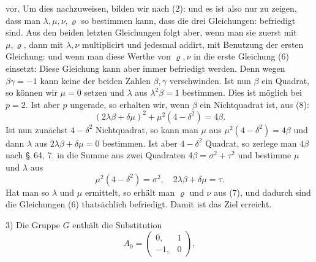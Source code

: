 vor. Um dies nachzuweisen, bilden wir nach (2):
und es ist also nur zu zeigen, dass man $\lambda,\mu,\nu,\varrho$ so bestimmen kann, dass die drei Gleichungen:
befriedigt sind. Aus den beiden letzten Gleichungen folgt aber, wenn man sie zuerst mit $\mu,\varrho$, dann mit $\lambda,\nu$ multiplicirt und jedesmal addirt, mit Benutzung der ersten Gleichung:
und wenn man diese Werthe von $\varrho,\nu$ in die erste Gleichung (6) einsetzt:
Diese Gleichung kann aber immer befriedigt werden. Denn wegen $\beta\gamma=-1$ kann keine der beiden Zahlen $\beta,\gamma$ verschwinden. Ist nun $\beta$ ein Quadrat, so k\"onnen wir $\mu=0$ setzen und $\lambda$ aus $\lambda^2\beta=1$ bestimmen. Dies ist  m\"oglich bei $p=2$. Ist aber $p$ ungerade, so erhalten wir, wenn $\beta$ ein Nichtquadrat ist, aus (8):
\[
(2\lambda\beta+\delta\mu)^2+\mu^2(4-\delta^2) = 4\beta.
\]
Ist nun zun\"achst $4-\delta^2$ Nichtquadrat, so kann man $\mu$ aus $\mu^2(4-\delta^2)=4\beta$ und dann $\lambda$ aus $2\lambda\beta+\delta\mu=0$ bestimmen. Ist aber $4-\delta^2$ Quadrat, so zerlege man $4\beta$ nach \S.\,64, 7. in die Summe aus zwei Quadraten $4\beta=\sigma^2+\tau^2$ und bestimme $\mu$ und $\lambda$ aus
\[
\mu^2(4-\delta^2) = \sigma^2, \quad 2\lambda\beta+\delta\mu = \tau.
\]
Hat man so $\lambda$ und $\mu$ ermittelt, so erh\"alt man $\varrho$ und $\nu$ aus (7), und dadurch sind die Gleichungen (6) thats\"achlich befriedigt. Damit ist das Ziel erreicht.

3) Die Gruppe $G$ enth\"alt die Substitution
\[
A_0 = \begin{pmatrix} 0, & 1 \\ -1, & 0 \end{pmatrix},
\]

